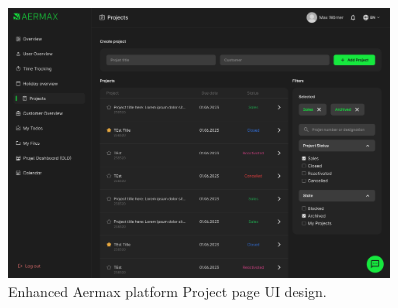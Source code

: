 \begin{figure}[H]
    \centering
    \includegraphics[width=0.9\textwidth]{src/assets/chapters/ui-ux--peoject.png}
    \caption{Enhanced Aermax platform Project page UI design.}
    \label{fig:enhanced_project_page}
\end{figure}

